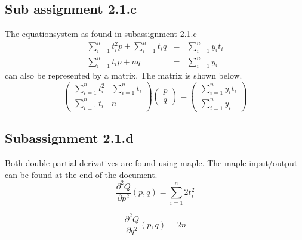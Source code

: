 \documentclass[english]{article}
\begin{document}
\subsection*{Sub assignment 2.1.c}
The equationsystem as found in subassignment 2.1.c
\begin{equation}
\begin{array}{ccc}
	\sum\limits_{i=1}^n t_i^2 p +\sum\limits_{i=1}^n t_i q & = & \sum\limits_{i=1}^n y_i t_i \\
	\sum\limits_{i=1}^n t_i p + nq & = & \sum\limits_{i=1}^n y_i
\end{array}
\end{equation}
can also be represented by a matrix. The matrix is shown below.
\begin{equation}
 \begin{pmatrix}
  \sum\limits_{i=1}^n t_i^2 & \sum\limits_{i=1}^n t_i \\
  \sum\limits_{i=1}^n t_i & n
 \end{pmatrix}
  \begin{pmatrix}
p \\ q
 \end{pmatrix}
 =
\begin{pmatrix}
 \sum\limits_{i=1}^n y_i t_i  \\ \sum\limits_{i=1}^n y_i
 \end{pmatrix}
\end{equation}

\subsection*{Subassignment 2.1.d}
Both double partial derivatives are found using maple. The maple input/output can be found at the end of the document.
\begin{equation}
	\frac{\partial^2 Q}{\partial p^2}(p,q) = \sum \limits_{i=1}^n 2t_i^2
\end{equation}

\begin{equation}
	\frac{\partial^2 Q}{\partial q^2}(p,q)= 2n
\end{equation}
\end{document}
